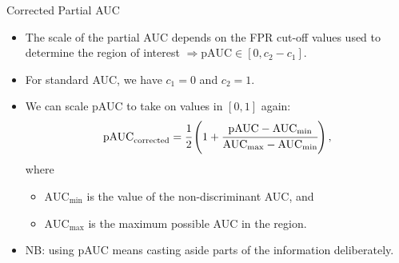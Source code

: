 \documentclass[11pt,compress,t,notes=noshow, xcolor=table]{beamer}
\begin{document}

\begin{vbframe}{Corrected Partial AUC}

\begin{itemize}
  \item The scale of the partial AUC depends on the FPR cut-off values used to 
  determine the region of interest $\Rightarrow \text{pAUC} \in [0, c_2 - c_1]$.
  \item For standard AUC, we have $c_1 = 0$ and $c_2 = 1$.
  \item We can scale pAUC to take on values in $[0, 1]$ again:
  $$\text{pAUC}_\text{corrected} = \cfrac{1}{2} \left( 1 + \cfrac{\text{pAUC} - 
  \text{AUC}_{\text{min}}}{\text{AUC}_{\text{max}} - \text{AUC}_{\text{min}}} 
  \right),$$
  where
  \begin{itemize}
    \item $\text{AUC}_{\text{min}}$ is the value of the non-discriminant AUC, 
    and
    \item $\text{AUC}_{\text{max}}$ is the maximum possible AUC in the region.
  \end{itemize}
  \lz
  \item NB: using pAUC means casting aside parts of the information 
  deliberately.
\end{itemize}

\end{vbframe}

\end{document}
